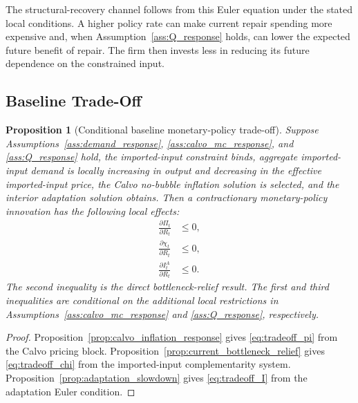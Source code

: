 ﻿\documentclass[12pt]{article}
\newtheorem{proposition}{Proposition}
\theoremstyle{remark}
\begin{document}
The structural-recovery channel follows from this Euler equation under the stated local
conditions. A higher policy rate can make current repair spending more expensive and, when
Assumption~\ref{ass:Q_response} holds, can lower the expected future benefit of repair. The firm
then invests less in reducing its future dependence on the constrained input.

\subsection{Baseline Trade-Off}

\begin{proposition}[Conditional baseline monetary-policy trade-off]\label{prop:baseline_tradeoff}
Suppose Assumptions~\ref{ass:demand_response}, \ref{ass:calvo_mc_response}, and
\ref{ass:Q_response} hold, the imported-input constraint binds, aggregate imported-input demand is
locally increasing in output and decreasing in the effective imported-input price, the Calvo
no-bubble inflation solution is selected, and the interior adaptation solution obtains. Then a
contractionary monetary-policy innovation has the following local effects:
\begin{align}
    \frac{\partial \Pi_t}{\partial R_t}&\le 0,
    \label{eq:tradeoff_pi}\\
    \frac{\partial \chi_t}{\partial R_t}&\le 0,
    \label{eq:tradeoff_chi}\\
    \frac{\partial I_t^A}{\partial R_t}&\le 0.
    \label{eq:tradeoff_I}
\end{align}
The second inequality is the direct bottleneck-relief result. The first and third inequalities are
conditional on the additional local restrictions in Assumptions~\ref{ass:calvo_mc_response} and
\ref{ass:Q_response}, respectively.
\end{proposition}

\begin{proof}
Proposition~\ref{prop:calvo_inflation_response} gives \eqref{eq:tradeoff_pi} from the Calvo
pricing block. Proposition~\ref{prop:current_bottleneck_relief} gives \eqref{eq:tradeoff_chi} from
the imported-input complementarity system. Proposition~\ref{prop:adaptation_slowdown} gives
\eqref{eq:tradeoff_I} from the adaptation Euler condition.
\end{proof}
\end{document}
